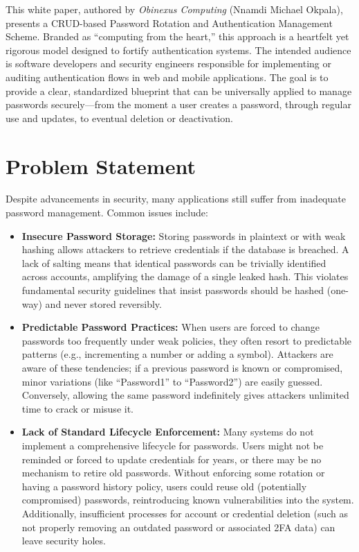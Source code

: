 \documentclass[11pt]{article}
\begin{document}
This white paper, authored by \textit{Obinexus Computing} (Nnamdi Michael Okpala), presents a CRUD-based Password Rotation and Authentication Management Scheme. Branded as ``computing from the heart,'' this approach is a heartfelt yet rigorous model designed to fortify authentication systems. The intended audience is software developers and security engineers responsible for implementing or auditing authentication flows in web and mobile applications. The goal is to provide a clear, standardized blueprint that can be universally applied to manage passwords securely—from the moment a user creates a password, through regular use and updates, to eventual deletion or deactivation.

\section{Problem Statement}
Despite advancements in security, many applications still suffer from inadequate password management. Common issues include:
\begin{itemize}
    \item \textbf{Insecure Password Storage:} Storing passwords in plaintext or with weak hashing allows attackers to retrieve credentials if the database is breached. A lack of salting means that identical passwords can be trivially identified across accounts, amplifying the damage of a single leaked hash. This violates fundamental security guidelines that insist passwords should be hashed (one-way) and never stored reversibly.
    \item \textbf{Predictable Password Practices:} When users are forced to change passwords too frequently under weak policies, they often resort to predictable patterns (e.g., incrementing a number or adding a symbol). Attackers are aware of these tendencies; if a previous password is known or compromised, minor variations (like ``Password1'' to ``Password2'') are easily guessed. Conversely, allowing the same password indefinitely gives attackers unlimited time to crack or misuse it.
    \item \textbf{Lack of Standard Lifecycle Enforcement:} Many systems do not implement a comprehensive lifecycle for passwords. Users might not be reminded or forced to update credentials for years, or there may be no mechanism to retire old passwords. Without enforcing some rotation or having a password history policy, users could reuse old (potentially compromised) passwords, reintroducing known vulnerabilities into the system. Additionally, insufficient processes for account or credential deletion (such as not properly removing an outdated password or associated 2FA data) can leave security holes.
\end{itemize}
\end{document}
